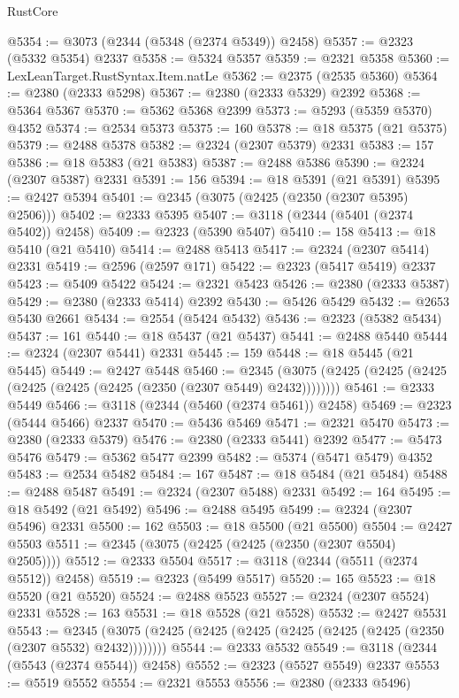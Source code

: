 \begin{lexlean}{RustCore}
\begin{coremodule}
@5354 := @3073 (@2344 (@5348 (@2374 @5349)) @2458)
@5357 := @2323 (@5332 @5354) @2337
@5358 := @5324 @5357
@5359 := @2321 @5358
@5360 := LexLeanTarget.RustSyntax.Item.natLe
@5362 := @2375 (@2535 @5360)
@5364 := @2380 (@2333 @5298)
@5367 := @2380 (@2333 @5329) @2392
@5368 := @5364 @5367
@5370 := @5362 @5368 @2399
@5373 := @5293 (@5359 @5370) @4352
@5374 := @2534 @5373
@5375 := 160
@5378 := @18 @5375 (@21 @5375)
@5379 := @2488 @5378
@5382 := @2324 (@2307 @5379) @2331
@5383 := 157
@5386 := @18 @5383 (@21 @5383)
@5387 := @2488 @5386
@5390 := @2324 (@2307 @5387) @2331
@5391 := 156
@5394 := @18 @5391 (@21 @5391)
@5395 := @2427 @5394
@5401 := @2345 (@3075 (@2425 (@2350 (@2307 @5395) @2506)))
@5402 := @2333 @5395
@5407 := @3118 (@2344 (@5401 (@2374 @5402)) @2458)
@5409 := @2323 (@5390 @5407)
@5410 := 158
@5413 := @18 @5410 (@21 @5410)
@5414 := @2488 @5413
@5417 := @2324 (@2307 @5414) @2331
@5419 := @2596 (@2597 @171)
@5422 := @2323 (@5417 @5419) @2337
@5423 := @5409 @5422
@5424 := @2321 @5423
@5426 := @2380 (@2333 @5387)
@5429 := @2380 (@2333 @5414) @2392
@5430 := @5426 @5429
@5432 := @2653 @5430 @2661
@5434 := @2554 (@5424 @5432)
@5436 := @2323 (@5382 @5434)
@5437 := 161
@5440 := @18 @5437 (@21 @5437)
@5441 := @2488 @5440
@5444 := @2324 (@2307 @5441) @2331
@5445 := 159
@5448 := @18 @5445 (@21 @5445)
@5449 := @2427 @5448
@5460 := @2345 (@3075 (@2425 (@2425 (@2425 (@2425 (@2425 (@2425 (@2350 (@2307 @5449) @2432))))))))
@5461 := @2333 @5449
@5466 := @3118 (@2344 (@5460 (@2374 @5461)) @2458)
@5469 := @2323 (@5444 @5466) @2337
@5470 := @5436 @5469
@5471 := @2321 @5470
@5473 := @2380 (@2333 @5379)
@5476 := @2380 (@2333 @5441) @2392
@5477 := @5473 @5476
@5479 := @5362 @5477 @2399
@5482 := @5374 (@5471 @5479) @4352
@5483 := @2534 @5482
@5484 := 167
@5487 := @18 @5484 (@21 @5484)
@5488 := @2488 @5487
@5491 := @2324 (@2307 @5488) @2331
@5492 := 164
@5495 := @18 @5492 (@21 @5492)
@5496 := @2488 @5495
@5499 := @2324 (@2307 @5496) @2331
@5500 := 162
@5503 := @18 @5500 (@21 @5500)
@5504 := @2427 @5503
@5511 := @2345 (@3075 (@2425 (@2425 (@2350 (@2307 @5504) @2505))))
@5512 := @2333 @5504
@5517 := @3118 (@2344 (@5511 (@2374 @5512)) @2458)
@5519 := @2323 (@5499 @5517)
@5520 := 165
@5523 := @18 @5520 (@21 @5520)
@5524 := @2488 @5523
@5527 := @2324 (@2307 @5524) @2331
@5528 := 163
@5531 := @18 @5528 (@21 @5528)
@5532 := @2427 @5531
@5543 := @2345 (@3075 (@2425 (@2425 (@2425 (@2425 (@2425 (@2425 (@2350 (@2307 @5532) @2432))))))))
@5544 := @2333 @5532
@5549 := @3118 (@2344 (@5543 (@2374 @5544)) @2458)
@5552 := @2323 (@5527 @5549) @2337
@5553 := @5519 @5552
@5554 := @2321 @5553
@5556 := @2380 (@2333 @5496)

\end{coremodule}
\end{lexlean}
